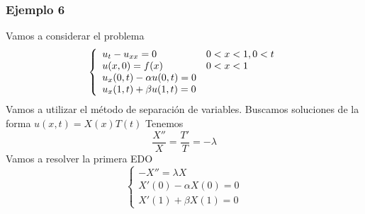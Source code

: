 \subsubsection*{Ejemplo 6}
Vamos a considerar el problema
\begin{equation*}
\left\{
\begin{array}{l l}
u_t-u_{xx}=0 & 0<x<1,0<t\\
u(x,0)=f(x) & 0<x<1\\
u_x(0,t)-\alpha u(0,t) = 0\\
u_x(1,t)+\beta u(1,t) = 0\\
\end{array}
\right.
\end{equation*}
Vamos a utilizar el método de separación de variables. Buscamos soluciones de la forma $u(x,t) = X(x)T(t)$ 
Tenemos
$$\frac{X''}{X}=\frac{T'}{T}=-\lambda$$
Vamos a resolver la primera EDO
\begin{equation*}
\left\{
\begin{array}{l}
-X''=\lambda X\\
X'(0) -\alpha X(0)=0\\
X'(1)+\beta X(1) = 0
\end{array}
\right.
\end{equation*}
